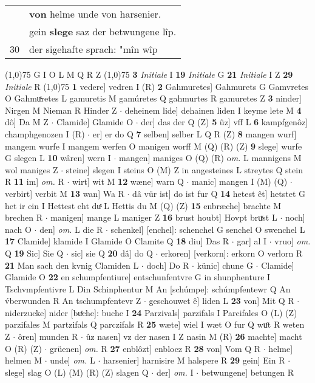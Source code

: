 \documentclass[8pt,a4paper,notitlepage]{article}
\begin{document}
\begin{table}[ht]
\begin{minipage}[t]{0.5\linewidth}
\begin{tabular}{rl}
 & \textbf{von} helme unde von harsenier.\\ 
 & gein \textbf{slege} saz der betwungene lîp.\\ 
30 & der sigehafte sprach: "mîn wîp\\ 
\end{tabular}
\scriptsize
\line(1,0){75} \newline
G I O L M Q R Z \newline
\line(1,0){75} \newline
\textbf{3} \textit{Initiale} I  \textbf{19} \textit{Initiale} G  \textbf{21} \textit{Initiale} I Z  \textbf{29} \textit{Initiale} R  \newline
\line(1,0){75} \newline
\textbf{1} vedere] vedren I (R) \textbf{2} Gahmuretes] Gahmurets G Gamvretes O Gahmuͯretes L gamuretis M gamúretes Q gahmurtes R gamuretes Z \textbf{3} ninder] Nirgen M Nieman R Hinder Z  $\cdot$ deheinem lide] dehainen liden I keyme lete M \textbf{4} dô] Da M Z  $\cdot$ Clamide] Glamide O  $\cdot$ der] das der Q (Z) \textbf{5} ûz] vff L \textbf{6} kampfgenôz] champhgenozen I (R)  $\cdot$ er] er do Q \textbf{7} selben] selber L Q R (Z) \textbf{8} mangen wurf] mangem wurfe I mangem werfen O manigen worff M (Q) (R) (Z) \textbf{9} slege] wurfe G slegen L \textbf{10} wâren] wern I  $\cdot$ mangen] maniges O (Q) (R) o\textit{m. } L mannigens M wol maniges Z  $\cdot$ steine] slegen I steins O (M) Z in angesteines L streytes Q stein R \textbf{11} im] \textit{om.} R  $\cdot$ wirt] wit M \textbf{12} wæne] warn Q  $\cdot$ manic] mangen I (M) (Q)  $\cdot$ verbirt] verbit M \textbf{13} wan] Wa R  $\cdot$ dâ vür ist] do ist fur Q \textbf{14} hetest êt] hetstet G het ir ein I Hettest eht duͯ L Hettis du M (Q) (Z) \textbf{15} enbræche] brachte M brechen R  $\cdot$ manigen] mange L maniger Z \textbf{16} brust houbt] Hovpt bruͯst L  $\cdot$ noch] nach O  $\cdot$ den] \textit{om.} L die R  $\cdot$ schenkel] [enchel]: schenchel G senchel O swenchel L \textbf{17} Clamide] klamide I Glamide O Clamite Q \textbf{18} diu] Das R  $\cdot$ gar] al I  $\cdot$ vruo] \textit{om.} Q \textbf{19} Sic] Sie Q  $\cdot$ sic] sie Q \textbf{20} dâ] do Q  $\cdot$ erkoren] [verkorn]: erkorn O verlorn R \textbf{21} Man sach den kvnig Clamiden L  $\cdot$ doch] Do R  $\cdot$ künic] chune G  $\cdot$ Clamide] Glamide O \textbf{22} en schumpfentiure] entschunfentvre G in shunphenture I Tschvmpfentivre L Din Schinphentur M An [schúmpe]: schúmpfentewr Q An v́berwunden R An tschumpfentevr Z  $\cdot$ geschouwet ê] liden L \textbf{23} von] Mit Q R  $\cdot$ niderzucke] nider [buͤche]: buche I \textbf{24} Parzivals] parzifals I Parcifales O (L) (Z) parzifales M partzifals Q parczifals R \textbf{25} wæte] wiel I wæt O fur Q wuͦt R weten Z  $\cdot$ ôren] munden R  $\cdot$ ûz nasen] vz der nasen I Z nasin M (R) \textbf{26} machte] macht O (R) (Z)  $\cdot$ grüenen] \textit{om.} R \textbf{27} enblôzt] enblocz R \textbf{28} von] Vom Q R  $\cdot$ helme] helmen M  $\cdot$ unde] \textit{om.} L  $\cdot$ harsenier] harnisire M halspere R \textbf{29} gein] Ein R  $\cdot$ slege] slag O (L) (M) (R) (Z) slagen Q  $\cdot$ der] \textit{om.} I  $\cdot$ betwungene] betungen R \newline

\end{minipage}
\end{table}
\end{document}
